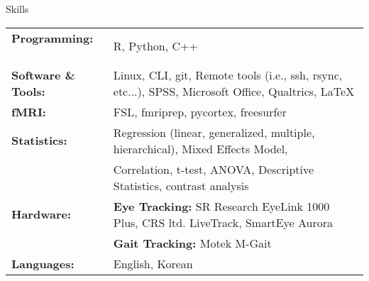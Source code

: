 \documentclass{resume} %
\begin{document}
%



\begin{rSection}{Skills}
    
    \begin{tabular}{ @{} >{\bfseries}l @{\hspace{3ex}} l }
        
        Programming: \ & R, Python, C++ \\%
        Software \& Tools: 
        & Linux, CLI, git, Remote tools (i.e., ssh, rsync, etc...), SPSS, Microsoft Office, Qualtrics, \LaTeX \\
        fMRI: \ & FSL, fmriprep, pycortex, freesurfer\\
        Statistics: \ & Regression (linear, generalized, multiple, hierarchical), Mixed Effects Model, \\
        \ & Correlation, t-test, ANOVA, Descriptive Statistics, contrast analysis \\
        Hardware: & {\textbf{Eye Tracking: }}SR Research  EyeLink 1000 Plus, CRS ltd. LiveTrack, SmartEye Aurora \\
        & {\textbf{Gait Tracking: }}Motek M-Gait \\
        Languages: \ &  English, Korean\\
        
    \end{tabular}
    
\end{rSection}


%    
%    
\end{document}
